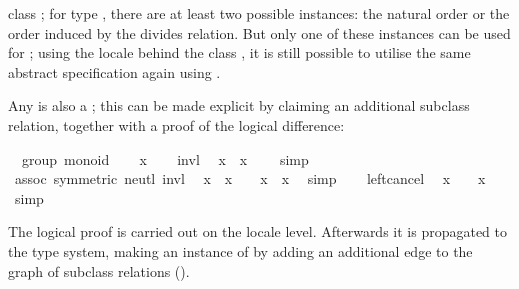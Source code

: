 \begin{isabellebody}
\begin{isamarkuptext}
  class ; for type , there are at least two
  possible instances: the natural order or the order induced by the
  divides relation.  But only one of these instances can be used for
  \hyperlink{command.instantiation}{\mbox{}}; using the locale behind the class , it is still possible to utilise the same abstract
  specification again using \hyperlink{command.interpretation}{\mbox{}}.%
\end{isamarkuptext}%
\isamarkuptrue%
%
\isamarkuptrue%
%
\begin{isamarkuptext}%
Any  is also a ; this can be made
  explicit by claiming an additional subclass relation, together with
  a proof of the logical difference:%
\end{isamarkuptext}%
\isamarkuptrue%
%
\isadelimquote
%
\endisadelimquote
%
\isatagquote
{}\isamarkupfalse%
\ {\isacharparenleft}\ group{\isacharparenright}\ monoid\isanewline
{}\isamarkupfalse%
\isanewline
\ \ \isamarkupfalse%
\ x\isanewline
\ \ \isamarkupfalse%
\ invl\ \isamarkupfalse%
\ {\isachardoublequoteopen}x{\isasymdiv}\ {\isasymotimes}\ x\ {\isacharequal}\ {\isasymone}{\isachardoublequoteclose}\ \isamarkupfalse%
\ simp\isanewline
\ \ \isamarkupfalse%
\ assoc\ {\isacharbrackleft}symmetric{\isacharbrackright}\ neutl\ invl\ \isamarkupfalse%
\ {\isachardoublequoteopen}x{\isasymdiv}\ {\isasymotimes}\ {\isacharparenleft}x\ {\isasymotimes}\ {\isasymone}{\isacharparenright}\ {\isacharequal}\ x{\isasymdiv}\ {\isasymotimes}\ x{\isachardoublequoteclose}\ \isamarkupfalse%
\ simp\isanewline
\ \ \isamarkupfalse%
\ left{\isacharunderscore}cancel\ \isamarkupfalse%
\ {\isachardoublequoteopen}x\ {\isasymotimes}\ {\isasymone}\ {\isacharequal}\ x{\isachardoublequoteclose}\ \isamarkupfalse%
\ simp\isanewline
{}\isamarkupfalse%
%
\endisatagquote
{\isafoldquote}%
%
\isadelimquote
%
\endisadelimquote
%
\begin{isamarkuptext}%
The logical proof is carried out on the locale level.  Afterwards it
  is propagated to the type system, making  an instance
  of  by adding an additional edge to the graph of
  subclass relations ().


\end{isamarkuptext}
\end{isabellebody}
